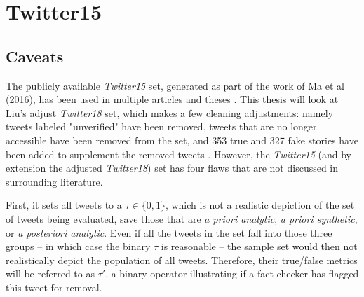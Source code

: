 \documentclass[NETN,manuscript]{stjour-new}
\begin{document}
 
 
 \section{Twitter15}
 \subsection{Caveats}
 The publicly available \textit{Twitter15} set, generated as part of the work of Ma et al (2016), has been used in multiple articles and theses \citep{liu2018early,ma2017detect,ma2016detecting,khoo2020interpretable,liu2019early,huang2019deep}. This thesis will look at Liu's adjust \textit{Twitter18} set, which makes a few cleaning adjustments: namely tweets labeled "unverified" have been removed, tweets that are no longer accessible have been removed from the set, and 353 true and 327 fake stories have been added to supplement the removed tweets \citep{liu2019early}. However, the \textit{Twitter15} (and by extension the adjusted \textit{Twitter18}) set has four flaws that are not discussed in surrounding literature. 
 
First, it sets all tweets to a $\tau \in \{0,1\}$, which is not a realistic depiction of the set of tweets being evaluated, save those that are \textit{a priori analytic}, \textit{a priori synthetic}, or \textit{a posteriori analytic}. Even if all the tweets in the set fall into those three groups -- in which case the binary $\tau$ is reasonable -- the sample set would then not realistically depict the population of all tweets. Therefore, their true/false metrics will be referred to as $\tau'$, a binary operator illustrating if a fact-checker has flagged this tweet for removal.
\end{document}
